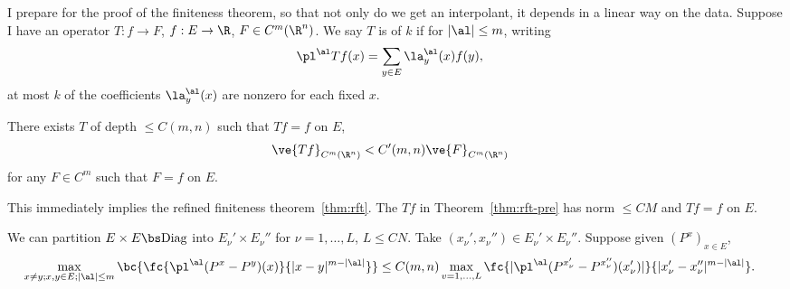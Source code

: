 I prepare for the proof of the finiteness theorem, so that not only do we get an interpolant, it depends in a linear way on the data. Suppose I have an operator $T:f\to F$, $f:E\to \R$, $F\in C^m(\R^n)$.  %
We say $T$ is of  $k$  if  for $|\al|\le m$, writing
\begin{align}
\pl^\al Tf(x) &= \sum_{y\in E} \la^\al_y(x) f(y),
\end{align}
at most $k$ of the coefficients $\la_y^\al(x)$ are nonzero for each fixed $x$. 

\begin{thm}\label{thm:rft-pre}
There exists $T$ of depth $\le C(m,n)$ such that $Tf=f$ on $E$, 
\begin{align}
\ve{Tf}_{C^m(\R^n)}&<C'(m,n)\ve{F}_{C^m(\R^n)}
\end{align}
for any $F\in C^m$ such that $F=f$ on $E$.
\end{thm}
This immediately  implies the refined finiteness theorem~\ref{thm:rft}. The $Tf$ in Theorem~\ref{thm:rft-pre} has norm $\le CM$ and $Tf=f$ on $E$. 

We can partition $E\times E\bs \text{Diag}$ into $E_\nu'\times E_\nu''$ for $\nu=1,\ldots, L$, $L\le CN$. Take $(x_\nu',x_\nu'')\in E_\nu'\times E_\nu''$. Suppose given $(P^x)_{x\in E}$,
\begin{align}
\max_{x\ne y; x,y\in E;|\al|\le m}
\bc{
\fc{\pl^\al(P^x-P^y)(x)}{|x-y|^{m-|\al|}}
}
&\le  C(m,n) \max_{v=1,\ldots, L}
\fc{|\pl^\al(P^{x_\nu'}-P^{x_\nu''})(x_\nu')|}{|x_\nu'-x_\nu''|^{m-|\al|}}.
\end{align}
